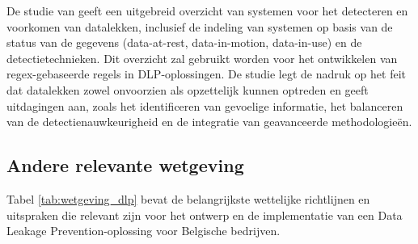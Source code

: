 De studie van \textcite{Nayak2020} geeft een uitgebreid overzicht van systemen voor het detecteren en voorkomen van datalekken, 
inclusief de indeling van systemen op basis van de status van de gegevens (data-at-rest, data-in-motion, dat\-a-in-use) en de detectietechnieken. 
Dit overzicht zal gebruikt worden voor het ontwikkelen van regex-gebaseerde regels in DLP-oploss\-ingen. 
De studie legt de nadruk op het feit dat datalekken zowel onvoorzien als opzettelijk kunnen optreden en geeft uitdagingen aan, 
zoals het identificeren van gevoelige informatie, het balanceren van de detectienauwkeurigheid en de integratie van geavanceerde methodologieën.


\subsection{Andere relevante wetgeving}%

Tabel \ref{tab:wetgeving_dlp} bevat de belangrijkste wettelijke richtlijnen en uitspraken die relevant zijn voor het ontwerp en de implementatie van een Data Leakage Prevention-oplossing voor Belgische bedrijven.


